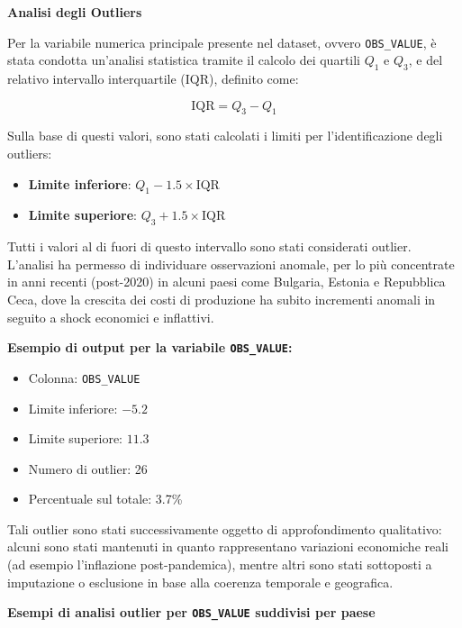 \documentclass[conference]{IEEEtran}
\begin{document}
\vspace{0.2em}
\vspace{1em} \noindent\textbf{Analisi degli Outliers}

Per la variabile numerica principale presente nel dataset, ovvero \texttt{OBS\_VALUE}, è stata condotta un’analisi statistica tramite il calcolo dei quartili $Q_1$ e $Q_3$, e del relativo intervallo interquartile (IQR), definito come:

\[
\text{IQR} = Q_3 - Q_1
\]

Sulla base di questi valori, sono stati calcolati i limiti per l'identificazione degli outliers:

\begin{itemize}
  \item \textbf{Limite inferiore}: $Q_1 - 1.5 \times \text{IQR}$
  \item \textbf{Limite superiore}: $Q_3 + 1.5 \times \text{IQR}$
\end{itemize}

Tutti i valori al di fuori di questo intervallo sono stati considerati outlier. L’analisi ha permesso di individuare osservazioni anomale, per lo più concentrate in anni recenti (post-2020) in alcuni paesi come Bulgaria, Estonia e Repubblica Ceca, dove la crescita dei costi di produzione ha subito incrementi anomali in seguito a shock economici e inflattivi.

\vspace{1em}\noindent\textbf{Esempio di output per la variabile \texttt{OBS\_VALUE}:}
\begin{itemize}
  \item Colonna: \texttt{OBS\_VALUE}
  \item Limite inferiore: $-5.2$
  \item Limite superiore: $11.3$
  \item Numero di outlier: 26
  \item Percentuale sul totale: 3.7\%
\end{itemize}

Tali outlier sono stati successivamente oggetto di approfondimento qualitativo: alcuni sono stati mantenuti in quanto rappresentano variazioni economiche reali (ad esempio l'inflazione post-pandemica), mentre altri sono stati sottoposti a imputazione o esclusione in base alla coerenza temporale e geografica.

\vspace{1em} \noindent\textbf{Esempi di analisi outlier per \texttt{OBS\_VALUE} suddivisi per paese}
\end{document}
